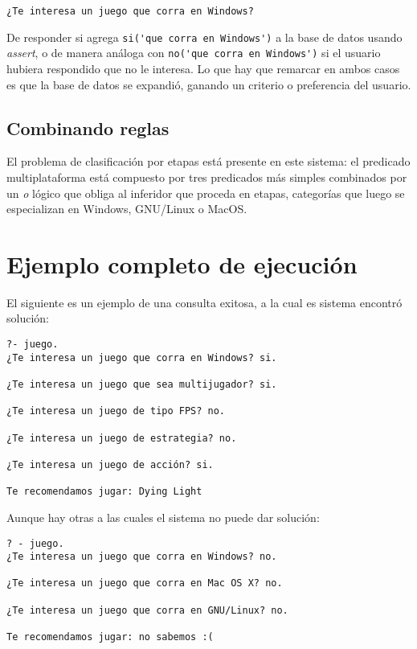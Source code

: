 \documentclass[11pt,oneside,a4paper]{article}
\begin{document}
\begin{verbatim}
¿Te interesa un juego que corra en Windows?
\end{verbatim}

De responder si agrega \verb|si('que corra en Windows')| a la base de datos usando 
\emph{assert}, o de manera análoga con \verb|no('que corra en Windows')| si el usuario
hubiera respondido que no le interesa. Lo que hay que remarcar en ambos casos 
es que la base de datos se expandió, ganando un criterio o preferencia del usuario.

\subsection{Combinando reglas} %

El problema de clasificación por etapas está presente en este sistema: el predicado 
multiplataforma está compuesto por tres predicados más simples
combinados por un \emph{o} lógico que obliga al inferidor que proceda en etapas, 
categorías que luego se especializan en Windows, GNU/Linux o MacOS. 


\newpage
\section{Ejemplo completo de ejecución}

El siguiente es un ejemplo de una consulta exitosa, a la cual es sistema encontró
solución:

\begin{verbatim}
?- juego.
¿Te interesa un juego que corra en Windows? si.

¿Te interesa un juego que sea multijugador? si.

¿Te interesa un juego de tipo FPS? no.

¿Te interesa un juego de estrategia? no.

¿Te interesa un juego de acción? si.

Te recomendamos jugar: Dying Light
\end{verbatim}

Aunque hay otras a las cuales el sistema no puede dar solución:

\begin{verbatim}
? - juego.
¿Te interesa un juego que corra en Windows? no.

¿Te interesa un juego que corra en Mac OS X? no.

¿Te interesa un juego que corra en GNU/Linux? no.

Te recomendamos jugar: no sabemos :(
\end{verbatim}
\end{document}
